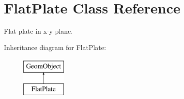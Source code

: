 \hypertarget{classFlatPlate}{}\section{Flat\+Plate Class Reference}
\label{classFlatPlate}


Flat plate in x-\/y plane.  


Inheritance diagram for Flat\+Plate\+:\begin{figure}[H]
\begin{center}
\leavevmode
\includegraphics[height=2.000000cm]{classFlatPlate}
\end{center}
\end{figure}
